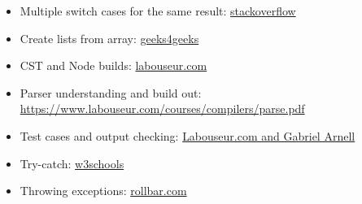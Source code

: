 \documentclass[letterpaper, 10pt,DIV=13]{scrartcl}
\numberwithin{equation}{section} %
\numberwithin{figure}{section} %
\numberwithin{table}{section} %
\begin{document}
\begin{itemize}
    \item Multiple switch cases for the same result: \href{https://stackoverflow.com/questions/5086322/java-switch-statement-multiple-cases}{stackoverflow}
    \item Create lists from array: \href{https://www.geeksforgeeks.org/arrays-aslist-method-in-java-with-examples/}{geeks4geeks}
    \item CST and Node builds: \href{https://www.labouseur.com/projects/jsTreeDemo/treeDemo.js}{labouseur.com}
    \item Parser understanding and build out: \href{labouseur.com}{https://www.labouseur.com/courses/compilers/parse.pdf}
    \item Test cases and output checking: \href{ttps://www.labouseur.com/courses/compilers/compilers/arnell/dist/index.html}{Labouseur.com and Gabriel Arnell}
    \item Try-catch: \href{https://www.w3schools.com/java/java_try_catch.asp}{w3schools}
    \item Throwing exceptions: \href{https://rollbar.com/guides/java/how-to-throw-exceptions-in-java/}{rollbar.com}
    
    
\end{itemize}

\pagebreak

% 
\end{document}
